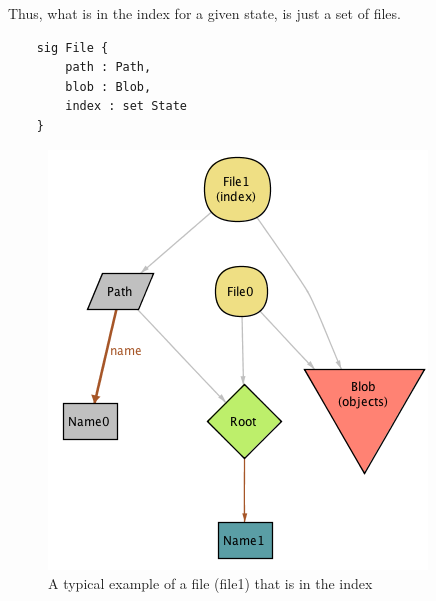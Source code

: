 Thus, what is in the index for a given state, is just a set of files.

\begin{lstlisting}
	sig File {
		path : Path,
		blob : Blob,
		index : set State
	}

\end{lstlisting}

\begin{figure}[h!] 
	\caption{A typical example of a file (file1) that is in the index}
	\centering
	\includegraphics[scale=0.65]{images/image2.png}
\end{figure}
\pagebreak

